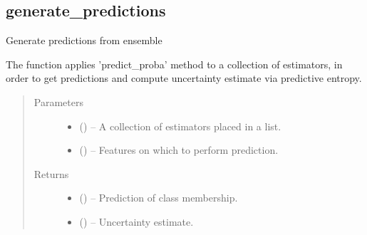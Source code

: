 \documentclass[letterpaper,10pt,english]{sphinxmanual}
\begin{document}
\subsection{generate\_predictions}
\label{\detokenize{api/ucf.generate_predictions:generate-predictions}}\label{\detokenize{api/ucf.generate_predictions::doc}}

\begin{fulllineitems}
\label{\detokenize{api/ucf.generate_predictions:ucf.generate_predictions}}
Generate predictions from ensemble

The function applies 'predict\_proba' method to a collection
of estimators, in order to get predictions and compute uncertainty
estimate via predictive entropy.
\begin{quote}\begin{description}
\item[{Parameters}] \leavevmode\begin{itemize}
\item {} 
 () -- A collection of estimators placed in a list.

\item {} 
 () -- Features on which to perform prediction.

\end{itemize}

\item[{Returns}] \leavevmode
\begin{itemize}
\item {} 
 () -- Prediction of class membership.

\item {} 
 () -- Uncertainty estimate.

\end{itemize}


\end{description}\end{quote}

\end{fulllineitems}
\end{document}
